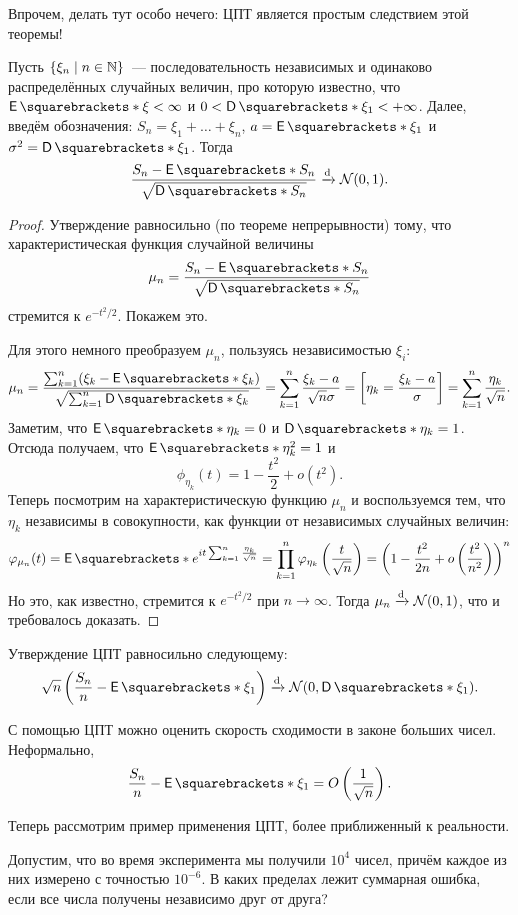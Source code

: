 Впрочем, делать тут особо нечего: ЦПТ является простым следствием этой теоремы!
\begin{theorem}
	Пусть \(\{\xi_{n} \mid n \in \mathbb{N}\}\)~--- последовательность независимых и одинаково распределённых случайных величин, про которую известно, что \(\E{\xi} < \infty\) и \(0 < \D{\xi_{1}} < +\infty\). Далее, введём обозначения: \(S_n = \xi_{1} + \dots + \xi_{n}\), \(a = \E{\xi_1}\) и \(\sigma^2 = \D{\xi_{1}}\). Тогда
	\[
		\frac{S_n - \E{S_n}}{\sqrt{\D{S_n}}} \dto \mathcal{N}(0, 1).
	\]
\end{theorem}
\begin{proof}
	Утверждение равносильно (по теореме непрерывности) тому, что характеристическая функция случайной величины
	\[
		\mu_{n} = \frac{S_n - \E{S_n}}{\sqrt{\D{S_n}}}
	\]
	стремится к \(e^{-t^2/2}\). Покажем это.
	
	Для этого немного преобразуем \(\mu_{n}\), пользуясь независимостью \(\xi_{i}\):
	\[
		\mu_{n} = \frac{\sum_{k = 1}^{n} (\xi_{k} - \E{\xi_{k}})}{\sqrt{\sum_{k = 1}^{n} \D{\xi_{k}}}} = \sum_{k = 1}^{n} \frac{\xi_{k} - a}{\sqrt{n}\sigma} = \left[\eta_{k} = \frac{\xi_{k} - a}{\sigma}\right] = \sum_{k = 1}^{n} \frac{\eta_{k}}{\sqrt{n}}.
	\]
	Заметим, что \(\E{\eta_{k}} = 0\) и \(\D{\eta_{k}} = 1\). Отсюда получаем, что \(\E{\eta_{k}^2} = 1\) и
	\[
		\phi_{\eta_k}(t) = 1 - \frac{t^2}{2} + o(t^2).
	\]
	Теперь посмотрим на характеристическую функцию \(\mu_{n}\) и воспользуемся тем, что \(\eta_{k}\) независимы в совокупности, как функции от независимых случайных величин:
	\[
		\phi_{\mu_n}(t) = \E{e^{it\sum_{k = 1}^{n} \frac{\eta_{k}}{\sqrt{n}}}} = \prod_{k = 1}^{n} \phi_{\eta_k}\left(\frac{t}{\sqrt{n}}\right) = \left(1 - \frac{t^2}{2n} + o\left(\frac{t^2}{n^2}\right)\right)^n
	\]
	Но это, как известно, стремится к \(e^{-t^2/2}\) при \(n \to \infty\). Тогда \(\mu_{n} \xrightarrow{\mathrm{d}} \mathcal{N}(0, 1)\), что и требовалось доказать.
\end{proof}
\begin{remark}
	Утверждение ЦПТ равносильно следующему:
	\[
		\sqrt{n}\left(\frac{S_n}{n} - \E{\xi_{1}}\right) \dto \mathcal{N}(0, \D{\xi_1}).
	\]
\end{remark}
\begin{consequence}
	С помощью ЦПТ можно оценить скорость сходимости в законе больших чисел. Неформально,
	\[
		\frac{S_n}{n} - \E{\xi_{1}} = O\left(\frac{1}{\sqrt{n}}\right).
	\]
\end{consequence}
Теперь рассмотрим пример применения ЦПТ, более приближенный к реальности.
\begin{example}
	Допустим, что во время эксперимента мы получили \(10^{4}\) чисел, причём каждое из них измерено с точностью \(10^{-6}\). В каких пределах лежит суммарная ошибка, если все числа получены независимо друг от друга?
\end{example}
